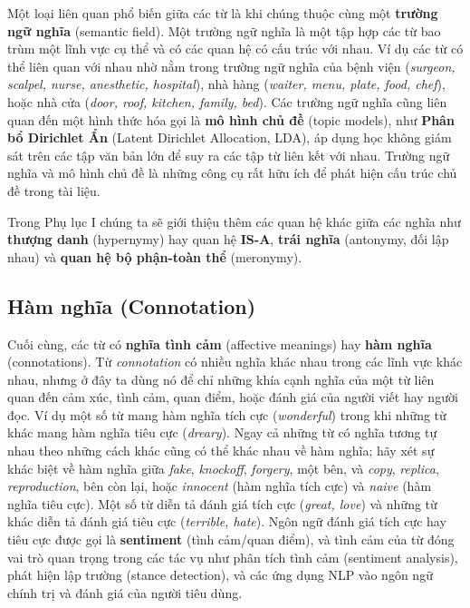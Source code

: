 Một loại liên quan phổ biến giữa các từ là khi chúng thuộc cùng một \textbf{trường ngữ nghĩa} (semantic field). Một trường ngữ nghĩa là một tập hợp các từ bao trùm một lĩnh vực cụ thể và có các quan hệ có cấu trúc với nhau. Ví dụ các từ có thể liên quan với nhau nhờ nằm trong trường ngữ nghĩa của bệnh viện (\emph{surgeon, scalpel, nurse, anesthetic, hospital}), nhà hàng (\emph{waiter, menu, plate, food, chef}), hoặc nhà cửa (\emph{door, roof, kitchen, family, bed}). Các trường ngữ nghĩa cũng liên quan đến một hình thức hóa gọi là \textbf{mô hình chủ đề} (topic models), như \textbf{Phân bổ Dirichlet Ẩn} (Latent Dirichlet Allocation, LDA), áp dụng học không giám sát trên các tập văn bản lớn để suy ra các tập từ liên kết với nhau. Trường ngữ nghĩa và mô hình chủ đề là những công cụ rất hữu ích để phát hiện cấu trúc chủ đề trong tài liệu.

Trong Phụ lục I chúng ta sẽ giới thiệu thêm các quan hệ khác giữa các nghĩa như \textbf{thượng danh} (hypernymy) hay quan hệ \textbf{IS-A}, \textbf{trái nghĩa} (antonymy, đối lập nhau) và \textbf{quan hệ bộ phận-toàn thể} (meronymy).

\subsection*{Hàm nghĩa (Connotation)}

Cuối cùng, các từ có \textbf{nghĩa tình cảm} (affective meanings) hay \textbf{hàm nghĩa} (connotations). Từ \emph{connotation} có nhiều nghĩa khác nhau trong các lĩnh vực khác nhau, nhưng ở đây ta dùng nó để chỉ những khía cạnh nghĩa của một từ liên quan đến cảm xúc, tình cảm, quan điểm, hoặc đánh giá của người viết hay người đọc. Ví dụ một số từ mang hàm nghĩa tích cực (\emph{wonderful}) trong khi những từ khác mang hàm nghĩa tiêu cực (\emph{dreary}). Ngay cả những từ có nghĩa tương tự nhau theo những cách khác cũng có thể khác nhau về hàm nghĩa; hãy xét sự khác biệt về hàm nghĩa giữa \emph{fake}, \emph{knockoff}, \emph{forgery}, một bên, và \emph{copy}, \emph{replica}, \emph{reproduction}, bên còn lại, hoặc \emph{innocent} (hàm nghĩa tích cực) và \emph{naive} (hàm nghĩa tiêu cực). Một số từ diễn tả đánh giá tích cực (\emph{great, love}) và những từ khác diễn tả đánh giá tiêu cực (\emph{terrible, hate}). Ngôn ngữ đánh giá tích cực hay tiêu cực được gọi là \textbf{sentiment} (tình cảm/quan điểm), và tình cảm của từ đóng vai trò quan trọng trong các tác vụ như phân tích tình cảm (sentiment analysis), phát hiện lập trường (stance detection), và các ứng dụng NLP vào ngôn ngữ chính trị và đánh giá của người tiêu dùng.

